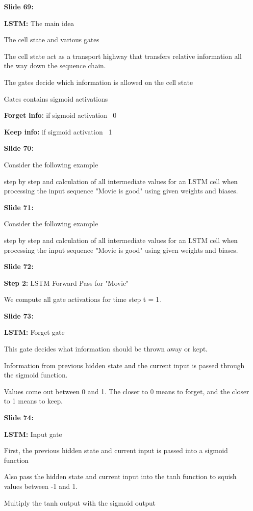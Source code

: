 \documentclass[11pt,a4paper]{article}
\begin{document}
\textbf{Slide 69:}

\textbf{LSTM:}  The main idea

The cell state and various gates

The cell state act as a transport highway that transfers relative information all the way down the sequence chain.

The gates decide which information is allowed on the cell state

Gates contains sigmoid activations

\textbf{Forget info:}  if sigmoid activation ~0

\textbf{Keep info:}  if sigmoid activation ~1

\textbf{Slide 70:}

Consider the following example

step by step and calculation of  all intermediate values for an LSTM cell when processing the input sequence "Movie is good" using given weights and biases.

\textbf{Slide 71:}

Consider the following example

step by step and calculation of  all intermediate values for an LSTM cell when processing the input sequence "Movie is good" using given weights and biases.

\textbf{Slide 72:}

\textbf{Step 2:}  LSTM Forward Pass for "Movie"

We compute all gate activations for time step t = 1.

\textbf{Slide 73:}

\textbf{LSTM:}  Forget gate

This gate decides what information should be thrown away or kept.

Information from previous hidden state and the current input is passed through the sigmoid function.

Values come out between 0 and 1. The closer to 0 means to forget, and the closer to 1 means to keep.

\textbf{Slide 74:}

\textbf{LSTM:}  Input gate

First, the previous hidden state and current input is passed into a sigmoid function

Also pass the hidden state and current input into the tanh function to squish values between -1 and 1.

Multiply the tanh output with the sigmoid output
\end{document}
